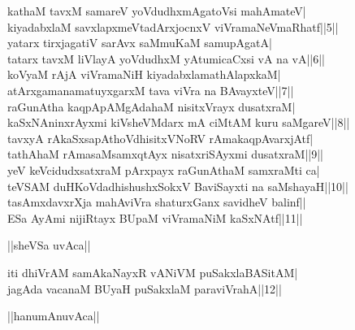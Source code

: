 \documentclass{article}
\begin{document}
kathaM tavxM samareV yoVdudhxmAgatoVsi mahAmateV|\\
kiyadabxlaM savxlapxmeVtadArxjocnxV viVramaNeVmaRhatf||5||\\
yatarx tirxjagatiV sarAvx saMmuKaM samupAgatA|\\
tatarx tavxM liVlayA yoVdudhxM yAtumicaCxsi vA na vA||6||\\
koVyaM rAjA viVramaNiH kiyadabxlamathAlapxkaM|\\
atArxgamanamatuyxgarxM tava viVra na BAvayxteV||7||\\
raGunAtha kaqpApAMgAdahaM nisitxVrayx dusatxraM|\\
kaSxNAninxrAyxmi kiVsheVMdarx mA ciMtAM kuru saMgareV||8||\\
tavxyA rAkaSxsapAthoVdhisitxVNoRV rAmakaqpAvarxjAtf|\\
tathAhaM rAmasaMsamxqtAyx nisatxriSAyxmi dusatxraM||9||\\
yeV keVcidudxsatxraM pArxpayx raGunAthaM samxraMti ca|\\
teVSAM duHKoVdadhishushxSokxV BaviSayxti na saMshayaH||10||\\
tasAmxdavxrXja mahAviVra shaturxGanx savidheV balinf||\\
ESa AyAmi nijiRtayx BUpaM viVramaNiM kaSxNAtf||11||\\

\begin{center}
||sheVSa uvAca||
\end{center}

iti dhiVrAM samAkaNayxR vANiVM puSakxlaBASitAM|\\
jagAda vacanaM BUyaH puSakxlaM paraviVrahA||12||\\

\begin{center}
||hanumAnuvAca||
\end{center}
\end{document}
